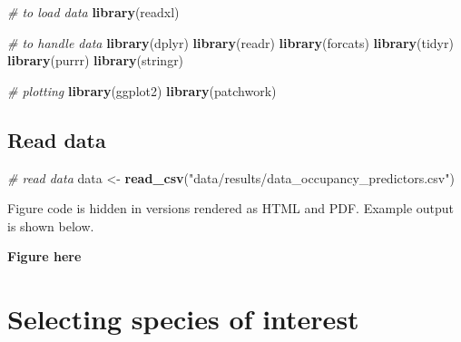 \documentclass[]{article}
\newenvironment{Shaded}{\begin{snugshade}}{\end{snugshade}}
\newcommand{\CommentTok}[1]{\textcolor[rgb]{0.56,0.35,0.01}{\textit{#1}}}
\newcommand{\DataTypeTok}[1]{\textcolor[rgb]{0.13,0.29,0.53}{#1}}
\newcommand{\KeywordTok}[1]{\textcolor[rgb]{0.13,0.29,0.53}{\textbf{#1}}}
\newcommand{\NormalTok}[1]{#1}
\newcommand{\OperatorTok}[1]{\textcolor[rgb]{0.81,0.36,0.00}{\textbf{#1}}}
\newcommand{\StringTok}[1]{\textcolor[rgb]{0.31,0.60,0.02}{#1}}
\begin{document}
\begin{Shaded}
\begin{Highlighting}[numbers=left,,]
\CommentTok{# to load data}
\KeywordTok{library}\NormalTok{(readxl)}

\CommentTok{# to handle data}
\KeywordTok{library}\NormalTok{(dplyr)}
\KeywordTok{library}\NormalTok{(readr)}
\KeywordTok{library}\NormalTok{(forcats)}
\KeywordTok{library}\NormalTok{(tidyr)}
\KeywordTok{library}\NormalTok{(purrr)}
\KeywordTok{library}\NormalTok{(stringr)}

\CommentTok{# plotting}
\KeywordTok{library}\NormalTok{(ggplot2)}
\KeywordTok{library}\NormalTok{(patchwork)}
\end{Highlighting}
\end{Shaded}

\hypertarget{read-data}{%
\subsection{Read data}\label{read-data}}

\begin{Shaded}
\begin{Highlighting}[numbers=left,,]
\CommentTok{# read data}
\NormalTok{data <-}\StringTok{ }\KeywordTok{read_csv}\NormalTok{(}\StringTok{"data/results/data_occupancy_predictors.csv"}\NormalTok{)}
\end{Highlighting}
\end{Shaded}

\begin{Shaded}
\end{Shaded}

Figure code is hidden in versions rendered as HTML and PDF.
Example output is shown below.

\textbf{Figure here}

\hypertarget{selecting-species-of-interest}{%
\section{Selecting species of interest}\label{selecting-species-of-interest}}
\end{document}
